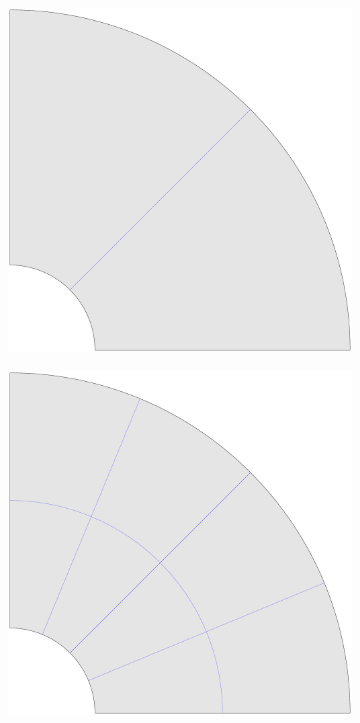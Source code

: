 \begin{figure}
    \centering
    \begin{subfigure}[b]{0.18\linewidth}        %
        \centering
        \includegraphics[width=\linewidth]{mesh_hole_0}
    \end{subfigure}
    \begin{subfigure}[b]{0.18\linewidth}        %
        \centering
        \includegraphics[width=\linewidth]{mesh_hole_1}

\end{subfigure}
\end{figure}
